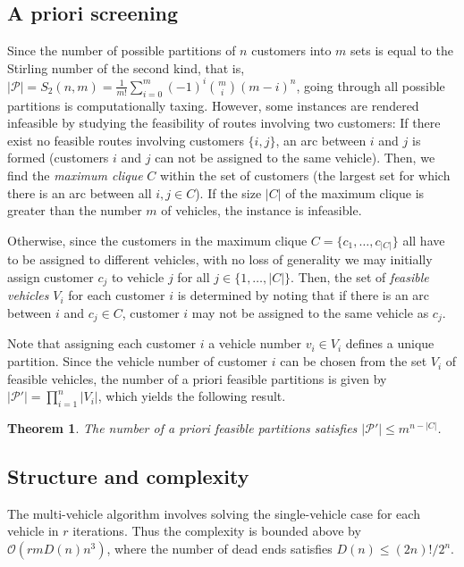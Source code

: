 \documentclass[dissertation,draft*]{aaltoseries}
\newtheorem{theorem}{Theorem}
\begin{document}
\subsection{A priori screening}
\label{earlydetection}
Since the  
number of possible partitions of $n$ customers into $m$ sets is equal to the Stirling number of the second kind, that is,
$|\mathcal{P}| = S_2(n,m) = \frac {1}{m!} \sum_{i=0}^{m} (-1)^i {m \choose i} (m-i)^n$,
going through all possible partitions is computationally taxing. However, some instances 
are rendered infeasible by studying the feasibility of routes involving two customers: 
If there exist no feasible routes involving customers $\{i,j\}$, an arc between $i$ and $j$ is formed 
(customers $i$ and $j$ can not be assigned to the same vehicle). Then, we find the \emph{maximum clique} $C$
within the set of customers (the largest set for which there is
an arc between all $i,j \in C$). If the size $|C|$ of the maximum clique
is greater than the number $m$ of vehicles, the instance is infeasible.

Otherwise, since the customers in the maximum clique $C = \{c_1,\ldots,c_{|C|}\}$ all have to be assigned to different vehicles, 
with no loss of generality we may initially assign customer $c_j$ to vehicle $j$ for all $j \in \{1,\ldots,|C|\}$.
Then, the set of \emph{feasible vehicles} $V_i$ for each customer $i$ is determined by noting that if there is an 
arc between $i$ and $c_j \in C$, customer $i$ may not be assigned to the same vehicle as $c_j$.

Note that assigning each customer $i$ a vehicle number $v_i \in V_i$ defines a unique partition.
Since the vehicle number of customer $i$ can be chosen from the set $V_i$ of feasible vehicles, 
the number of a priori feasible partitions is given by $|\mathcal{P}'| = \prod_{i=1}^n |V_i|$, which yields the following result.

\begin{theorem}
\label{partitions}
The number of a priori feasible partitions satisfies $|\mathcal{P}'| \leq m^{n-|C|}$.
\end{theorem}


\subsection{Structure and complexity}
\label{mvstructure}
The multi-vehicle algorithm involves solving the single-vehicle case
for each vehicle in $r$ iterations. Thus the complexity is bounded above by $\mathcal{O}\left(rmD(n)n^3\right)$, 
where the number of dead ends satisfies $D(n) \leq (2n)!/2^n$.                                                                                                                  
\end{document}
